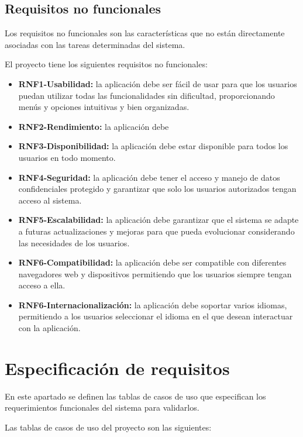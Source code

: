\subsection{Requisitos no funcionales}
Los requisitos no funcionales son las características que no están directamente asociadas con las tareas determinadas del sistema.

El proyecto tiene los siguientes requisitos no funcionales:
\begin{itemize}
\tightlist
    \item \textbf{RNF1-Usabilidad:} la aplicación debe ser fácil de usar para que los usuarios puedan utilizar todas las funcionalidades sin dificultad, proporcionando menús y opciones intuitivas y bien organizadas.
    \item \textbf{RNF2-Rendimiento:} la aplicación debe
    \item \textbf{RNF3-Disponibilidad:} la aplicación debe estar disponible para todos los usuarios en todo momento.
    \item \textbf{RNF4-Seguridad:} la aplicación debe tener el acceso y manejo de datos confidenciales protegido y garantizar que solo los usuarios autorizados tengan acceso al sistema.
    \item \textbf{RNF5-Escalabilidad:} la aplicación debe garantizar que el sistema se adapte a futuras actualizaciones y mejoras para que pueda evolucionar considerando las necesidades de los usuarios.
    \item \textbf{RNF6-Compatibilidad:} la aplicación debe ser compatible con diferentes navegadores web y dispositivos permitiendo que los usuarios siempre tengan acceso a ella.
    \item \textbf{RNF6-Internacionalización:} la aplicación debe soportar varios idiomas, permitiendo a los usuarios seleccionar el idioma en el que desean interactuar con la aplicación. 
\end{itemize}

\section{Especificación de requisitos}
En este apartado se definen las tablas de casos de uso que especifican los requerimientos funcionales del sistema para validarlos.

Las tablas de casos de uso del proyecto son las siguientes:

